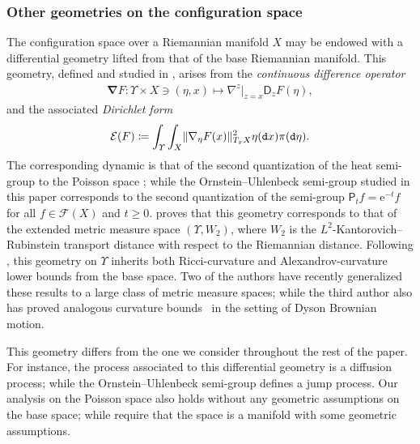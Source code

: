 \documentclass[JEP,XML,SOM,Unicode,published]{cedram}
\theoremstyle{definition}
\theoremstyle{remark}
\DeclarePairedDelimiter{\norm}{\lVert}{\rVert}
\begin{document}
\subsubsection{Other geometries on the configuration space}
The configuration space over a Riemannian manifold $X$ may be endowed with a differential geometry lifted from that of the base Riemannian manifold.
This geometry, defined and studied in \cite{AKR}, arises from the \emph{continuous difference operator}\vspace*{-3pt}
\begin{align*}
\mathbf{\nabla} F\colon \varUpsilon \times X \ni (\eta,x)\longmapsto \nabla^z\big\vert_{z=x} \mathsf{D}_{z}F(\eta),
\end{align*}
and the associated \emph{Dirichlet form}\vspace*{-3pt}
\begin{equation*}
\mathcal{E}(F) \coloneq \int_{\varUpsilon} \int_{X} \norm{ \mathbf{\nabla}_{\eta}F(x) }_{T_{x}X}^{2} \eta(\mathtt{d} x) \pi(\mathtt{d} \eta).
\end{equation*}
The corresponding dynamic is that of the second quantization of the heat semi-group to the Poisson space \cite{Surgailis}; while the Ornstein--Uhlenbeck semi-group studied in this paper corresponds to the second quantization of the semi-group $\mathsf{P}_{t} f = \mathrm{e}^{-t} f$ for all $f \in \mathscr{F}(X)$ and $t \ge 0$.
\cite{RoecknerSchied} proves that this geometry corresponds to that of the extended metric measure space $(\varUpsilon, W_{2})$, where $W_{2}$ is the $L^2$-Kantorovich--Rubinstein transport distance with respect to the Riemannian distance.
Following \cite{ErbarHuesmann}, this geometry on $\varUpsilon$ inherits both Ricci-curvature and Alexandrov-curvature lower bounds from the base space.
Two of the authors \cite{LzDSSuz21,LzDSSuz22} have recently generalized these results to a large class of metric measure spaces; while the third author also has proved analogous curvature bounds~\cite{Suz22} in the setting of Dyson Brownian motion.

This geometry differs from the one we consider throughout the rest of the paper.
For instance, the process associated to this differential geometry is a diffusion process; while the Ornstein--Uhlenbeck semi-group defines a jump process.
Our analysis on the Poisson space also holds without any geometric assumptions on the base space; while \cite{AKR,ErbarHuesmann} require that the space is a manifold with some geometric assumptions.
\end{document}
